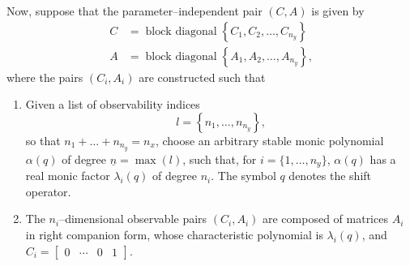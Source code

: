 \documentclass{tufte-handout}
\DeclareMathOperator{\blkdiag}{block\ diagonal}
\begin{document}
Now, suppose that the parameter--independent pair $(C,A)$ is given by
\begin{align}
C & = \blkdiag \left\{ C_1, C_2, \ldots, C_{n_y} \right\} \label{eq:C} \\ 
A & = \blkdiag \left\{ A_1, A_2, \ldots, A_{n_y} \right\} \text{,} \label{eq:A}
\end{align}
where the pairs $(C_i, A_i)$ are constructed such that
\begin{enumerate}
\item Given a list of observability indices $$l = \left\{ n_{1}, \ldots, n_{n_y} \right\} \text{,}$$ 
{so that $n_{1} + \ldots + n_{n_y} = n_x$,} 
choose an arbitrary stable monic polynomial $\alpha(q)$ of degree $\underline{n}=\max(l)$, such that, for $i=\{1,\dots,n_y\}$, $\alpha(q)$ has a real monic factor $\lambda_i(q)$ of degree $n_i$. The symbol $q$ denotes the shift operator.
\item The $n_i$--dimensional observable pairs $\left(C_i,A_i\right)$ are composed of matrices $A_i$ in right companion form, whose characteristic polynomial is $\lambda_i(q)$, and $C_i = \begin{bmatrix} 0 & \cdots & 0 & 1 \end{bmatrix}$.
\end{enumerate}
\end{document}
